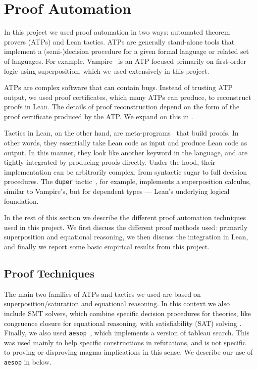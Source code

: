 \section{Proof Automation}\label{automated-sec}

In this project we used proof automation in two ways: automated theorem provers (ATPs) and Lean tactics.
ATPs are generally stand-alone tools that implement a (semi-)decision procedure for a given formal language or related set of languages.
For example, Vampire~\cite{DBLP:conf/cav/KovacsV13} is an ATP focused primarily on first-order logic using superposition, which we used extensively in this project.

ATPs are complex software that can contain bugs.
Instead of trusting ATP output, we used proof certificates, which many ATPs can produce, to reconstruct proofs in Lean.
The details of proof reconstruction depend on the form of the proof certificate produced by the ATP.
We expand on this in .

Tactics in Lean, on the other hand, are meta-programs~\cite{DBLP:journals/pacmpl/EbnerURAM17} that build proofs.
In other words, they essentially take Lean code as input and produce Lean code as output.
In this manner, they look like another keyword in the language, and are tightly integrated by producing proofs directly.
Under the hood, their implementation can be arbitrarily complex, from syntactic sugar to full decision procedures.
The \texttt{duper} tactic~\cite{DBLP:conf/itp/CluneQBA24}, for example, implements a superposition calculus, similar to Vampire's, but for dependent types --- Lean's underlying logical foundation.

In the rest of this section we describe the different proof automation techniques used in this project.
We first discuss the different proof methods used: primarily superposition and equational reasoning, we then discuss the integration in Lean, and finally we report some basic empirical results from this project.

\subsection{Proof Techniques}

The main two families of ATPs and tactics we used are based on superposition/saturation and equational reasoning.
In this context we also include SMT solvers, which combine specific decision procedures for theories, like congruence closure for equational reasoning, with satisfiability (SAT) solving \cite{deMoura-Bjorner-2009}.
Finally, we also used \texttt{aesop}~\cite{DBLP:conf/cpp/LimpergF23}, which implements a version of tableau search.
This was used mainly to help specific constructions in refutations, and is not specific to proving or disproving magma implications in this sense.
We describe our use of \texttt{aesop} in  below.

